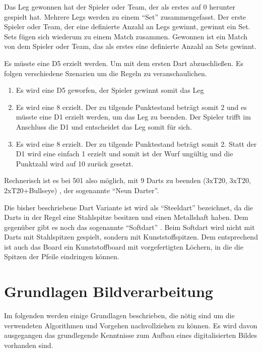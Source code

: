 Das Leg gewonnen hat der Spieler oder Team, der als erstes auf 0 herunter gespielt hat. Mehrere Legs werden zu einem "`Set"'  zusammengefasst. Der erste Spieler oder Team, der eine definierte Anzahl an Legs gewinnt, gewinnt ein Set. Sets fügen sich wiederum zu einem Match zusammen. Gewonnen ist ein Match von dem Spieler oder Team, das als erstes eine definierte Anzahl an Sets gewinnt.

\begin{example} 

Es müsste eine D5 erzielt werden. Um mit dem ersten Dart abzuschließen. Es folgen verschiedene Szenarien um die Regeln zu veranschaulichen.
\begin{enumerate}
	\item Es wird eine D5 geworfen, der Spieler gewinnt somit das Leg
	\item Es wird eine 8 erzielt. Der zu tilgende Punktestand beträgt somit 2 und es müsste eine D1 erzielt werden, um das Leg zu beenden. Der Spieler trifft im Anschluss die D1 und entscheidet das Leg somit für sich. 
	\item Es wird eine 8 erzielt. Der zu tilgende Punktestand beträgt somit 2. Statt der D1 wird eine einfach 1 erzielt und somit ist der Wurf ungültig und die Punktzahl wird auf 10 zurück gesetzt.
\end{enumerate}
\end{example}

Rechnerisch ist es bei 501 also möglich, mit 9 Darts zu beenden (3xT20, 3xT20, 2xT20+Bullseye) , der sogenannte "`Neun Darter"'.

Die bisher beschriebene Dart Variante ist wird als "`Steeldart"' bezeichnet, da die Darts in der Regel eine Stahlspitze besitzen und einen Metallshaft haben. Dem gegenüber gibt es noch das sogenannte "`Softdart"' . Beim Softdart wird nicht mit Darts mit Stahlspitzen gespielt, sondern mit Kunststoffspitzen. Dem entsprechend ist auch das Board ein Kunststoffboard mit vorgefertigten Löchern, in die die Spitzen der Pfeile eindringen können. 

\section{Grundlagen Bildverarbeitung}
\label{sec:basics}
Im folgenden werden einige Grundlagen beschrieben, die nötig sind um die verwendeten Algorithmen und Vorgehen nachvollziehen zu können. Es wird davon ausgegangen das grundlegende Kenntnisse zum Aufbau eines digitalisierten Bildes vorhanden sind. 
